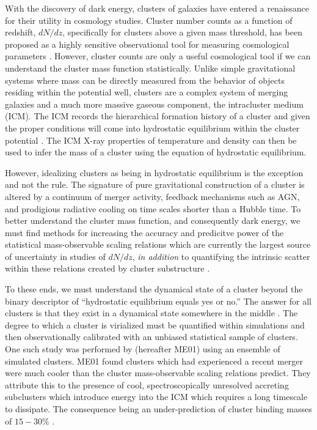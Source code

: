 \documentclass{emulateapj}
\begin{document}
With the discovery of dark energy, clusters of galaxies have entered
a renaissance for their utility in cosmology studies. Cluster number
counts as a function of redshift, $dN/dz$, specifically for clusters above a
given mass threshold, has been proposed as a highly
sensitive observational tool for measuring cosmological parameters
\citep{1989ApJ...341L..71E, 1998ApJ...508..483W, 2001ApJ...553..545H,
2003PhRvD..67h1304H, 2004PhRvD..70l3008W}.
However, cluster counts are only a useful
cosmological tool if we can understand the cluster mass function
statistically. Unlike simple gravitational systems where mass can be
directly measured from the behavior of objects residing within
the potential well, clusters are a complex system of merging galaxies
and a much more massive gaseous component, the intracluster medium (ICM).
The ICM records the hierarchical formation history of a cluster and
given the proper conditions will come into hydrostatic equilibrium
within the cluster potential
\citep{2005RvMP...77..207V,1996ApJ...469..494E}. The ICM X-ray
properties of temperature and density can then be used to infer the
mass of a cluster using the equation of hydrostatic equilibrium.

However, idealizing clusters as being in hydrostatic equilibrium is
the exception and not the rule. The signature of pure gravitational
construction of a cluster is altered by a continuum of merger
activity, feedback mechanisms such as AGN, and prodigious radiative
cooling on time scales shorter than a Hubble time. To better
understand the cluster mass function, and consequently dark energy, we
must find methods for increasing the accuracy and predicitve power of the statistical
mass-observable scaling relations which are currently the largest
source of uncertainty in studies of $dN/dz$, {\textit{in addition}} to
quantifying the intrinsic scatter within these relations created by
cluster substructure \citep{2005PhRvD..72d3006L}.

To these ends, we must understand the dynamical state of a cluster
beyond the binary descriptor of ``hydrostatic equilibrium equals yes
or no.'' The answer for all clusters is that they exist in a dynamical
state somewhere in the middle \citep{2006ApJ...639...64O,
2006ApJ...650..128K}. The
degree to which a cluster is virialized must be quantified within
simulations and then observationally calibrated with an unbiased
statistical sample of clusters. One such study was performed by
\cite{2001ApJ...546..100M} (hereafter ME01) using an ensemble of
simulated clusters. ME01 found clusters which had experienced a recent
merger were much cooler than the cluster mass-observable scaling
relations predict. They attribute this to the presence of cool,
spectroscopically unresolved accreting subclusters which introduce
energy into the ICM which requires a long timescale to
dissipate. The consequence being an under-prediction
of cluster binding masses of $15-30\%$ \citep{2001ApJ...546..100M}.
\end{document}

